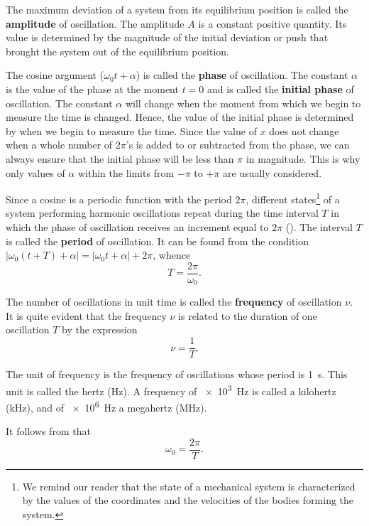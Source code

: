 The maximum deviation of a system from its equilibrium position is called the \textbf{amplitude} of oscillation. The amplitude $A$ is a constant positive quantity. Its value is determined by the magnitude of the initial deviation or push that brought the system out of the equilibrium position.

The cosine argument ($\omega_0 t+\alpha$) is called the \textbf{phase} of oscillation. The constant $\alpha$ is the value of the phase at the moment $t=0$ and is called the \textbf{initial phase} of oscillation. The constant $\alpha$ will change when the moment from which we begin to measure the time is changed. Hence, the value of the initial phase is determined by when we begin to measure the time. Since the value of $x$ does not change when a whole number of $2\pi$'s is added to or subtracted from the phase, we can always ensure that the initial phase will be less than $\pi$ in magnitude. This is why only values of $\alpha$ within the limits from $-\pi$ to $+\pi$ are usually considered.

Since a cosine is a periodic function with the period $2\pi$, different states\footnote{We remind our reader that the state of a mechanical system is characterized by the values of the coordinates and the velocities of the bodies forming the system.} of a system performing harmonic oscillations repeat during the time interval $T$ in which the phase of oscillation receives an increment equal to $2\pi$ (). The interval $T$ is called the \textbf{period} of oscillation. It can be found from the condition $|\omega_0(t+T)+\alpha|=|\omega_0 t+\alpha|+2\pi$, whence
\begin{equation}\label{eq:7_56}
	T = \frac{2\pi}{\omega_0}.
\end{equation}

The number of oscillations in unit time is called the \textbf{frequency} of oscillation $\nu$. It is quite evident that the frequency $\nu$ is related to the duration of one oscillation $T$ by the expression
\begin{equation}\label{eq:7_57}
	\nu = \frac{1}{T}.
\end{equation}

\noindent
The unit of frequency is the frequency of oscillations whose period is \SI{1}{\second}. This unit is called the hertz (\si{\hertz}). A frequency of \SI{e3}{\hertz} is called a kilohertz (\si{\kilo\hertz}), and of \SI{e6}{\hertz} a megahertz (\si{\mega\hertz}).

It follows from  that
\begin{equation}\label{eq:7_58}
	\omega_0 = \frac{2\pi}{T}.
\end{equation}

